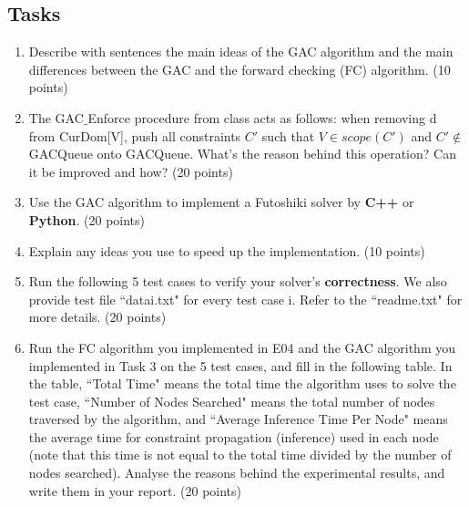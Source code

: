 ﻿\documentclass[a4paper, 11pt]{article}
\begin{document}
\subsection{Tasks}

\begin{enumerate}
\item Describe with sentences the main ideas of the GAC algorithm and the main differences between the GAC and the forward checking (FC) algorithm. (10 points)
\item %

     The GAC$\_$Enforce procedure from class acts as follows: when removing d from CurDom[V], push all constraints $C'$ such that $V\in scope(C')$ and $C'\not\in$ GACQueue onto GACQueue. What's the reason behind this operation? Can it be improved and how? (20 points)

\item Use the GAC algorithm to implement a Futoshiki solver by \textbf{C++} or \textbf{Python}. (20 points)
\item Explain any ideas you use to speed up the implementation. (10 points)
\item Run the following 5 test cases to verify your solver's \textbf{correctness}. We also provide test file ``datai.txt" for every test case i. Refer to the ``readme.txt" for more details. (20 points)
\item Run the FC algorithm you implemented in E04 and the GAC algorithm you implemented in Task 3 on the 5 test cases, and fill in the following table. In the table,
    ``Total Time" means the total time the algorithm uses to solve the test case,  ``Number of Nodes Searched" means the total number of nodes traversed by the algorithm, 
    and ``Average Inference Time Per Node" means the average time for constraint propagation (inference) 
used in each node (note that this time is not equal to the total time divided by the number of nodes searched). Analyse the reasons behind the experimental results, and write them in your report. (20 points)
\setlength{\tabcolsep}{2mm}{

}
\end{enumerate}
\end{document}
